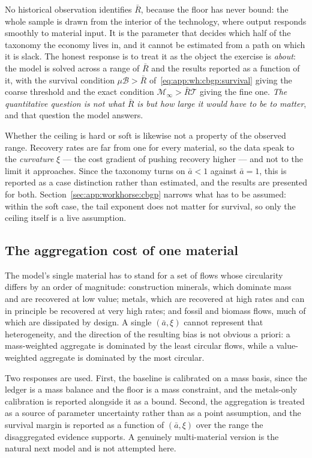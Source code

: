  No historical observation identifies $\bar R$, because the floor has never bound: the whole sample is drawn from the interior of the technology, where output responds smoothly to material input. It is the parameter that decides which half of the taxonomy the economy lives in, and it cannot be estimated from a path on which it is slack. The honest response is to treat it as the object the exercise is \emph{about}: the model is solved across a range of $\bar R$ and the results reported as a function of it, with the survival condition $\mu\mathcal B>\bar R$ of~\eqref{eq:app:wh:cbgp:survival} giving the coarse threshold and the exact condition $\mathcal M_\infty>\bar R\mathcal T$ giving the fine one. \emph{The quantitative question is not what $\bar R$ is but how large it would have to be to matter}, and that question the model answers.

 Whether the ceiling is hard or soft is likewise not a property of the observed range. Recovery rates are far from one for every material, so the data speak to the \emph{curvature} $\xi$ --- the cost gradient of pushing recovery higher --- and not to the limit it approaches. Since the taxonomy turns on $\bar a<1$ against $\bar a=1$, this is reported as a case distinction rather than estimated, and the results are presented for both. Section~\ref{sec:app:workhorse:cbgp} narrows what has to be assumed: within the soft case, the tail exponent does not matter for survival, so only the ceiling itself is a live assumption.

\subsection{The aggregation cost of one material}\label{sec:q:cal:aggregation}

The model's single material has to stand for a set of flows whose circularity differs by an order of magnitude: construction minerals, which dominate mass and are recovered at low value; metals, which are recovered at high rates and can in principle be recovered at very high rates; and fossil and biomass flows, much of which are dissipated by design. A single $\left(\bar a,\xi\right)$ cannot represent that heterogeneity, and the direction of the resulting bias is not obvious a priori: a mass-weighted aggregate is dominated by the least circular flows, while a value-weighted aggregate is dominated by the most circular.

Two responses are used. First, the baseline is calibrated on a mass basis, since the ledger is a mass balance and the floor is a mass constraint, and the metals-only calibration is reported alongside it as a bound. Second, the aggregation is treated as a source of parameter uncertainty rather than as a point assumption, and the survival margin is reported as a function of $\left(\bar a,\xi\right)$ over the range the disaggregated evidence supports. A genuinely multi-material version is the natural next model and is not attempted here.

